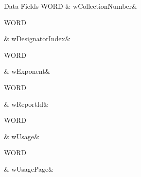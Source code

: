 \begin{DoxyFields}{Data Fields}
\hypertarget{a00003_ad962b6446afb5cdce525b95c0396fe5a}{W\-O\-R\-D}\label{a00003_ad962b6446afb5cdce525b95c0396fe5a}
&
w\-Collection\-Number&
\\
\hline

\hypertarget{a00003_aca3a581b38716dce31cad00c6e75c283}{W\-O\-R\-D}\label{a00003_aca3a581b38716dce31cad00c6e75c283}
&
w\-Designator\-Index&
\\
\hline

\hypertarget{a00003_a23ec7baf057162933a77bd8e3c3c976d}{W\-O\-R\-D}\label{a00003_a23ec7baf057162933a77bd8e3c3c976d}
&
w\-Exponent&
\\
\hline

\hypertarget{a00003_a6664c6e9cad28120cd3f7d7679680b4b}{W\-O\-R\-D}\label{a00003_a6664c6e9cad28120cd3f7d7679680b4b}
&
w\-Report\-Id&
\\
\hline

\hypertarget{a00003_a0d3e1ceaeb1960389350277978573941}{W\-O\-R\-D}\label{a00003_a0d3e1ceaeb1960389350277978573941}
&
w\-Usage&
\\
\hline

\hypertarget{a00003_ab55ab386802010c34f363f9a2615be89}{W\-O\-R\-D}\label{a00003_ab55ab386802010c34f363f9a2615be89}
&
w\-Usage\-Page&
\\
\hline

\end{DoxyFields}
\label{d4/d63/a00082}
\hypertarget{a00003_d4/d63/a00082}{}
